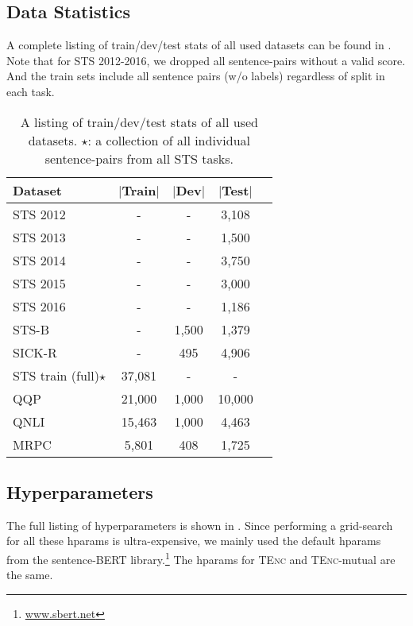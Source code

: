 \documentclass{article} \usepackage{iclr2021_conference,times}
\newcommand{\tenc}{\textsc{TEnc}\xspace}
\begin{document}
\subsection{Data Statistics}\label{sec:data_stats}

A complete listing of train/dev/test stats of all used datasets can be found in . Note that for STS 2012-2016, we dropped all sentence-pairs without a valid score. And the train sets include all sentence pairs (w/o labels) regardless of split in each task.

\begin{table*}[h] \small
\centering
\begin{tabular}{lcccc}
\toprule
Dataset & $|$Train$|$ & $|$Dev$|$ & $|$Test$|$ \\
\midrule
STS 2012 & - & - & 3,108 \\
STS 2013 & - & - & 1,500 \\
STS 2014 & - & - & 3,750 \\
STS 2015 & - & - & 3,000 \\
STS 2016 & - & - & 1,186 \\
STS-B & - & 1,500  & 1,379 \\
SICK-R & - & 495 & 4,906 \\
STS train (full)$\star$ & 37,081 & - & -\\
\midrule
QQP & 21,000 & 1,000 & 10,000 \\
QNLI & 15,463 & 1,000 & 4,463 \\
MRPC & 5,801 & 408 & 1,725 \\
\bottomrule
\end{tabular}
\caption{A listing of train/dev/test stats of all used datasets. $\star$: a collection of all individual sentence-pairs from all STS tasks.}
\label{tab:data_stat}
\end{table*}


\subsection{Hyperparameters}\label{sec:hparams}
The full listing of hyperparameters is shown in . 
Since performing a grid-search for all these hparams is ultra-expensive, we mainly used the default hparams from the sentence-BERT library.\footnote{\url{www.sbert.net}} 
The hparams for \tenc and \tenc-mutual are the same.
\end{document}
